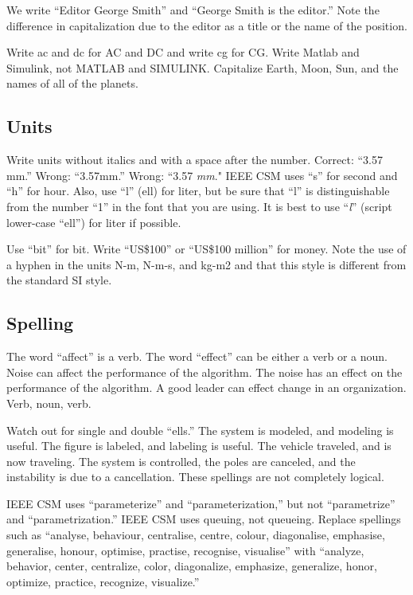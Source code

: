 We write ``Editor George Smith'' and ``George Smith is the editor.''  Note the difference in capitalization due to the editor as a title or the name of the position.

Write ac and dc for AC and DC and write cg for CG. Write Matlab and Simulink, not MATLAB and SIMULINK. Capitalize Earth, Moon, Sun, and the names of all of the planets.

\subsection{Units}
Write units without italics and with a space after the number.  Correct: ``3.57 mm.''  Wrong:  ``3.57mm.''   Wrong:  ``3.57 \textit{mm}."
%
IEEE CSM uses ``s'' for second and ``h'' for hour.  Also, use ``l'' (ell) for liter, but be sure that ``l'' is distinguishable from the number ``1'' in the font that you are using.  It is best to use ``\textit{l}'' (script lower-case ``ell'') for liter if possible.

Use ``bit'' for bit. Write ``US\$100'' or ``US\$100 million'' for money.
%
Note the use of a hyphen in the units N-m, N-m-s, and kg-m2 and that this style is different from the standard SI style.


\subsection{Spelling}


The word ``affect'' is a verb.  The word ``effect'' can be either a verb or a noun.  Noise can affect the performance of the algorithm.  The noise has an effect on the performance of the algorithm.  A good leader can effect change in an organization.  Verb, noun, verb.

Watch out for single and double ``ells.''  The system is modeled, and modeling is useful.  The figure is labeled, and labeling is useful.  The vehicle traveled, and is now traveling.  The system is controlled, the poles are canceled, and the instability is due to a cancellation.  These spellings are not completely logical.

IEEE CSM uses ``parameterize'' and ``parameterization,'' but not ``parametrize'' and  ``parametrization.'' IEEE CSM uses queuing, not queueing.
%
Replace spellings such as ``analyse, behaviour, centralise, centre, colour, diagonalise, emphasise, generalise,  honour, optimise, practise, recognise, visualise'' with  ``analyze, behavior, center, centralize, color, diagonalize, emphasize, generalize, honor, optimize, practice, recognize, visualize.'' 